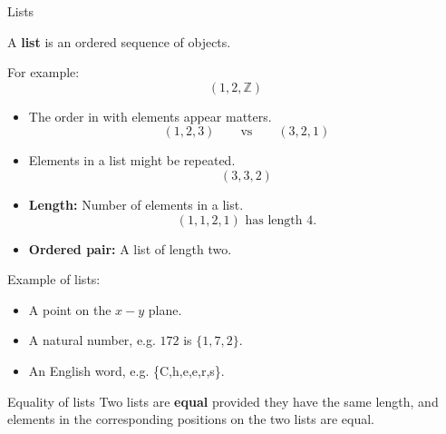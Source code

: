 \documentclass{beamer}
\begin{document}
\begin{frame}{Lists}
\begin{block}{}
A \textbf{list} is an ordered sequence of objects.
\end{block}\pause
For example:
\[
(1,2,\mathbb{Z})
\]\vspace{-0.2cm}\pause
\begin{itemize}
\item The order in with elements appear matters.
\[
(1,2,3)\qquad\textrm{vs}\qquad (3,2,1)
\]\vspace{-0.2cm}\pause
\item Elements in a list might be repeated.
\[
(3,3,2)
\]\vspace{-0.2cm}\pause
\item \textbf{Length:} Number of elements in a list.
\[
\textrm{$(1,1,2,1)$ has length 4.}
\]\vspace{-0.2cm}\pause
\item \textbf{Ordered pair:} A list of length two.
\end{itemize}
\end{frame}

\begin{frame}
Example of lists:
\begin{itemize}
\item A point on the $x-y$ plane. \\

\begin{figure}
\end{figure}\pause
\item A natural number, e.g. $172$ is $\{1,7,2\}$.\pause
\item An English word, e.g. \{C,h,e,e,r,s\}.\pause
\end{itemize}
\begin{block}{Equality of lists}
Two lists are \textbf{equal} provided they have the same length, and elements in the corresponding positions on the two lists are equal.
\end{block}
\end{frame}
\end{document}
